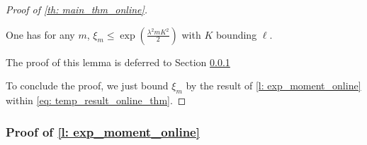 \begin{proof}[Proof of \cref{th: main_thm_online}]
\begin{lemma}
\label{l: exp_moment_online}
One has for any $m$, $\xi_m \leq \exp\left(\frac{\lambda^2m K^2}{2}\right)$ with $K$ bounding $\ell$.
\end{lemma}

The proof of this lemma is deferred to Section \ref{sec: proof_exp_moment_online}


To conclude the proof, we just bound $\xi_m$ by the result of \cref{l: exp_moment_online} within \cref{eq: temp_result_online_thm}.
\end{proof}

\subsubsection{Proof of \cref{l: exp_moment_online}}
\label{sec: proof_exp_moment_online}


